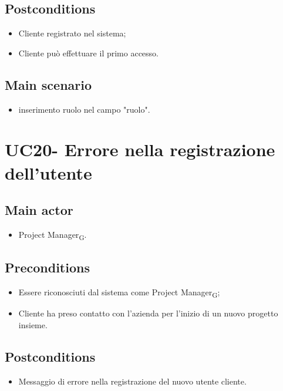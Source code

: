\documentclass{article}
\begin{document}
    \subsection*{Postconditions}
        \begin{itemize}
            \item Cliente registrato nel sistema;
            \item Cliente può effettuare il primo accesso.
        \end{itemize}

    \subsection*{Main scenario}
        \begin{itemize}
            \item inserimento ruolo nel campo "ruolo".
        \end{itemize}

\section{UC20- Errore nella registrazione dell'utente}
\subsection*{Main actor}
        \begin{itemize}
            \item Project Manager\textsubscript{G}.
        \end{itemize}
        
    \subsection*{Preconditions}
        \begin{itemize}
            \item Essere riconosciuti dal sistema come Project Manager\textsubscript{G};
            \item Cliente ha preso contatto con l'azienda per l'inizio di un nuovo progetto insieme.
        \end{itemize}
        
    \subsection*{Postconditions}
        \begin{itemize}
            \item Messaggio di errore nella registrazione del nuovo utente cliente.
        \end{itemize}
\end{document}
